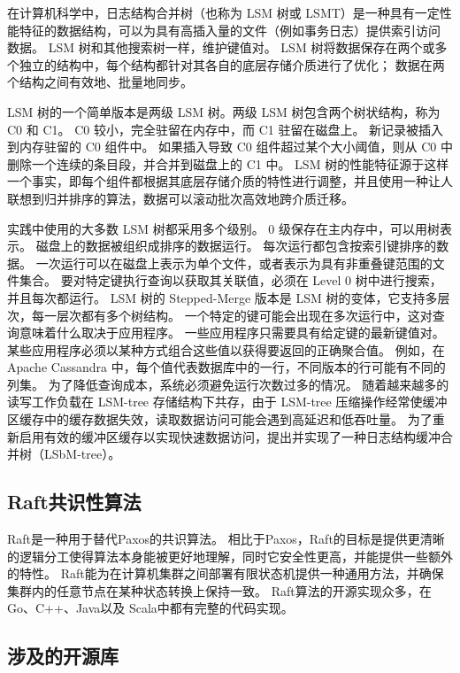 	在计算机科学中，日志结构合并树（也称为 LSM 树或 LSMT）是一种具有一定性能特征的数据结构，可以为具有高插入量的文件（例如事务日志）提供索引访问 数据。 
	LSM 树和其他搜索树一样，维护键值对。 LSM 树将数据保存在两个或多个独立的结构中，每个结构都针对其各自的底层存储介质进行了优化； 数据在两个结构之间有效地、批量地同步。

	LSM 树的一个简单版本是两级 LSM 树。两级 LSM 树包含两个树状结构，称为 C0 和 C1。 C0 较小，完全驻留在内存中，而 C1 驻留在磁盘上。 
	新记录被插入到内存驻留的 C0 组件中。 如果插入导致 C0 组件超过某个大小阈值，则从 C0 中删除一个连续的条目段，并合并到磁盘上的 C1 中。 
	LSM 树的性能特征源于这样一个事实，即每个组件都根据其底层存储介质的特性进行调整，并且使用一种让人联想到归并排序的算法，数据可以滚动批次高效地跨介质迁移。

	实践中使用的大多数 LSM 树都采用多个级别。 
	0 级保存在主内存中，可以用树表示。 
	磁盘上的数据被组织成排序的数据运行。 每次运行都包含按索引键排序的数据。 
	一次运行可以在磁盘上表示为单个文件，或者表示为具有非重叠键范围的文件集合。
	要对特定键执行查询以获取其关联值，必须在 Level 0 树中进行搜索，并且每次都运行。 
	LSM 树的 Stepped-Merge 版本是 LSM 树的变体，它支持多层次，每一层次都有多个树结构。
	一个特定的键可能会出现在多次运行中，这对查询意味着什么取决于应用程序。 一些应用程序只需要具有给定键的最新键值对。 某些应用程序必须以某种方式组合这些值以获得要返回的正确聚合值。 例如，在 Apache Cassandra 中，每个值代表数据库中的一行，不同版本的行可能有不同的列集。 
	为了降低查询成本，系统必须避免运行次数过多的情况。
	随着越来越多的读写工作负载在 LSM-tree 存储结构下共存，由于 LSM-tree 压缩操作经常使缓冲区缓存中的缓存数据失效，读取数据访问可能会遇到高延迟和低吞吐量。 
	为了重新启用有效的缓冲区缓存以实现快速数据访问，提出并实现了一种日志结构缓冲合并树（LSbM-tree）。 

	\subsection{Raft共识性算法}

	Raft是一种用于替代Paxos的共识算法。
	相比于Paxos，Raft的目标是提供更清晰的逻辑分工使得算法本身能被更好地理解，同时它安全性更高，并能提供一些额外的特性。
	Raft能为在计算机集群之间部署有限状态机提供一种通用方法，并确保集群内的任意节点在某种状态转换上保持一致。
	Raft算法的开源实现众多，在Go、C++、Java以及 Scala中都有完整的代码实现。

    \subsection{涉及的开源库}
	
